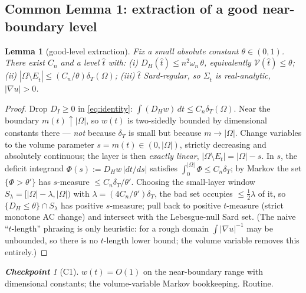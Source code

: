 \documentclass[11pt]{amsart}
\newtheorem{lemma}[theorem]{Lemma}
\theoremstyle{definition}
\theoremstyle{remark}
\newtheorem*{checkpoint}{\textbf{Checkpoint}}
\newcommand{\Om}{\Omega}
\newcommand{\Et}{E_{\hat t}}
\newcommand{\St}{\Sigma_{\hat t}}
\newcommand{\dT}{\delta_T}
\newcommand{\Vbar}{\mathcal V}
\begin{document}
\subsection{Common Lemma 1: extraction of a good near-boundary level}
\begin{lemma}[good-level extraction]\label{lem:step1}
Fix a small absolute constant $\theta\in(0,1)$. There exist $C_n$ and a level
$\hat t$ with: \textup{(i)} $D_H(\hat t)\le n^2\omega_n\,\theta$, equivalently
$\Vbar(\hat t)\le\theta$; \textup{(ii)} $|\Om\setminus\Et|\le(C_n/\theta)\dT(\Om)$;
\textup{(iii)} $\hat t$ Sard-regular, so $\St$ is real-analytic, $|\nabla u|>0$.
\end{lemma}
\begin{proof}
Drop $D_I\ge0$ in \eqref{eq:identity}: $\int(D_H w)\,dt\le C_n\dT(\Om)$. Near
the boundary $m(t)\uparrow|\Om|$, so $w(t)$ is two-sidedly bounded by
dimensional constants there --- \emph{not} because $\dT$ is small but because
$m\to|\Om|$. Change variables to the volume parameter $s=m(t)\in(0,|\Om|)$,
strictly decreasing and absolutely continuous; the layer is then
\emph{exactly linear}, $|\Om\setminus E_t|=|\Om|-s$. In $s$, the deficit
integrand $\Phi(s):=D_H w\,|dt/ds|$ satisfies $\int_0^{|\Om|}\Phi\le C_n\dT$;
by Markov the set $\{\Phi>\theta'\}$ has $s$-measure $\le C_n\dT/\theta'$.
Choosing the small-layer window $S_\lambda=[|\Om|-\lambda,|\Om|)$ with
$\lambda=(4C_n/\theta')\dT$, the bad set occupies $\le\tfrac12\lambda$ of it, so
$\{D_H\le\theta\}\cap S_\lambda$ has positive $s$-measure; pull back to
positive $t$-measure (strict monotone AC change) and intersect with the
Lebesgue-null Sard set. (The naive ``$t$-length'' phrasing is only heuristic:
for a rough domain $\int|\nabla u|^{-1}$ may be unbounded, so there is no
$t$-length lower bound; the volume variable removes this entirely.)
\end{proof}
\begin{checkpoint}[C1]
$w(t)=O(1)$ on the near-boundary range with dimensional constants; the
volume-variable Markov bookkeeping. Routine.
\end{checkpoint}
\end{document}
